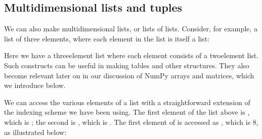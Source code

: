\documentclass[letterpaper,10pt,english]{sphinxmanual}
\begin{document}
\subsection{Multidimensional lists and tuples}
\label{\detokenize{chap3/chap3_arrays:multidimensional-lists-and-tuples}}
\sphinxAtStartPar
We can also make multidimensional lists, or lists of lists.  Consider, for example, a list of three elements, where each element in the list is itself a list:

\begin{sphinxVerbatim}[commandchars=\\\{\}]
  \PYG{p}{[}\PYG{p}{[} \PYG{p}{]} \PYG{p}{[} \PYG{p}{]} \PYG{p}{[} \PYG{p}{]}\PYG{p}{]}
\end{sphinxVerbatim}

\sphinxAtStartPar
Here we have a three\sphinxhyphen{}element list where each element consists of a two\sphinxhyphen{}element list.  Such constructs can be useful in making tables and other structures.  They also become relevant later on in our discussion of NumPy arrays and matrices, which we introduce below.

\sphinxAtStartPar
We can access the various elements of a list with a straightforward extension of the indexing scheme we have been using.  The first element of the list  above is , which is \sphinxcode{\sphinxupquote{{[}3, 9{]}}}; the second is , which is \sphinxcode{\sphinxupquote{{[}8, 5{]}}}.  The first element of  is accessed as  , which  is 8, as illustrated below:

\begin{sphinxVerbatim}[commandchars=\\\{\},numbers=left,firstnumber=1,stepnumber=1]
\PYG{p}{[}\PYG{p}{]}
\PYG{p}{[} \PYG{p}{]}

\PYG{p}{[}\PYG{p}{]}
\PYG{p}{[} \PYG{p}{]}

\PYG{p}{[}\PYG{p}{]}\PYG{p}{[}\PYG{p}{]}

\PYG{p}{[}\PYG{p}{]}\PYG{p}{[}\PYG{p}{]}
\end{sphinxVerbatim}
\end{document}
